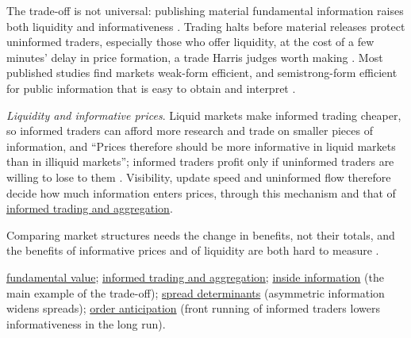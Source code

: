 \begin{qfdefinition}
The trade-off is not universal: publishing material fundamental information raises both liquidity and informativeness \citep[chap.~``Informed Traders and Market Efficiency'', sec.~10.6.8, pp.~241--242]{alpha-harris}. Trading halts before material releases protect uninformed traders, especially those who offer liquidity, at the cost of a few minutes' delay in price formation, a trade Harris judges worth making \citep[same chap., box, p.~241]{alpha-harris}. Most published studies find markets weak-form efficient, and semistrong-form efficient for public information that is easy to obtain and interpret \citep[same chap., p.~240]{alpha-harris}.

\emph{Liquidity and informative prices}. Liquid markets make informed trading cheaper, so informed traders can afford more research and trade on smaller pieces of information, and ``Prices therefore should be more informative in liquid markets than in illiquid markets''; informed traders profit only if uninformed traders are willing to lose to them \citep[chap.~``Good Markets'', sec.~9.5.4, pp.~215--216]{alpha-harris}. Visibility, update speed and uninformed flow therefore decide how much information enters prices, through this mechanism and that of \hyperref[res:informed-trading-aggregation]{informed trading and aggregation}.

 Comparing market structures needs the change in benefits, not their totals, and the benefits of informative prices and of liquidity are both hard to measure \citep[same chap., sec.~10.6.7, p.~241]{alpha-harris}.

 \hyperref[def:fundamental-value]{fundamental value}; \hyperref[res:informed-trading-aggregation]{informed trading and aggregation}; \hyperref[def:inside-information]{inside information} (the main example of the trade-off); \hyperref[res:spread-determinants]{spread determinants} (asymmetric information widens spreads); \hyperref[def:order-anticipation]{order anticipation} (front running of informed traders lowers informativeness in the long run).


\end{qfdefinition}

